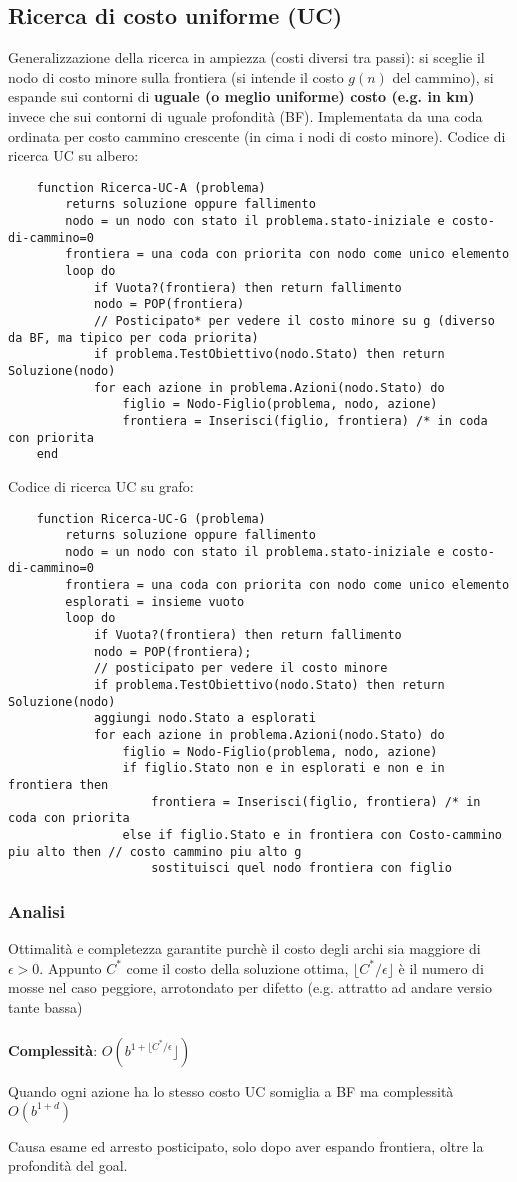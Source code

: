 \subsection{Ricerca di costo uniforme (UC)}
Generalizzazione della ricerca in ampiezza (costi diversi tra passi): si sceglie il
nodo di costo minore sulla frontiera (si intende il costo $g(n)$ del cammino), si espande sui 
contorni di \textbf{uguale (o meglio uniforme) costo (e.g. in km)} invece che sui
contorni di uguale profondità (BF).
Implementata da una coda ordinata per costo cammino crescente (in cima i nodi di costo minore).
Codice di ricerca UC su albero:
\begin{lstlisting}
	function Ricerca-UC-A (problema)
		returns soluzione oppure fallimento
		nodo = un nodo con stato il problema.stato-iniziale e costo-di-cammino=0
		frontiera = una coda con priorita con nodo come unico elemento
		loop do
			if Vuota?(frontiera) then return fallimento
			nodo = POP(frontiera)
			// Posticipato* per vedere il costo minore su g (diverso da BF, ma tipico per coda priorita)
			if problema.TestObiettivo(nodo.Stato) then return Soluzione(nodo)
			for each azione in problema.Azioni(nodo.Stato) do
				figlio = Nodo-Figlio(problema, nodo, azione)
				frontiera = Inserisci(figlio, frontiera) /* in coda con priorita
	end
\end{lstlisting}
Codice di ricerca UC su grafo:
\begin{lstlisting}
	function Ricerca-UC-G (problema)
		returns soluzione oppure fallimento
		nodo = un nodo con stato il problema.stato-iniziale e costo-di-cammino=0
		frontiera = una coda con priorita con nodo come unico elemento
		esplorati = insieme vuoto
		loop do
			if Vuota?(frontiera) then return fallimento
			nodo = POP(frontiera);
			// posticipato per vedere il costo minore
			if problema.TestObiettivo(nodo.Stato) then return Soluzione(nodo)
			aggiungi nodo.Stato a esplorati
			for each azione in problema.Azioni(nodo.Stato) do
				figlio = Nodo-Figlio(problema, nodo, azione)
				if figlio.Stato non e in esplorati e non e in frontiera then
					frontiera = Inserisci(figlio, frontiera) /* in coda con priorita
				else if figlio.Stato e in frontiera con Costo-cammino piu alto then // costo cammino piu alto g
					sostituisci quel nodo frontiera con figlio
\end{lstlisting}

\subsubsection{Analisi}
Ottimalità e completezza garantite purchè il costo degli archi sia maggiore di $\epsilon > 0$.
Appunto $C^*$ come il costo della soluzione ottima, $\lfloor C^*/\epsilon \rfloor$ è il numero 
di mosse nel caso peggiore, arrotondato per difetto (e.g. attratto ad andare versio tante bassa)\\\\
\textbf{Complessità}: $O(b^{1+\lfloor C^*/\epsilon}\rfloor)$
\begin{note}
	Quando ogni azione ha lo stesso costo UC somiglia a BF ma complessità $O(b^{1+d})$
\end{note}
Causa esame ed arresto posticipato, solo dopo aver espando frontiera, oltre la profondità del goal.
